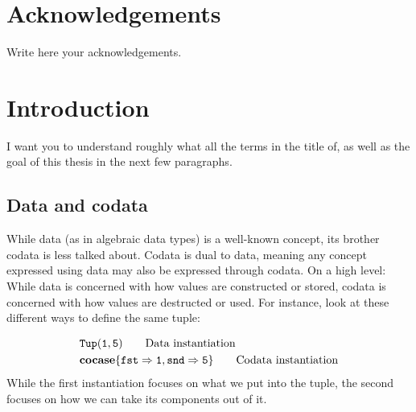\documentclass[twoside,12pt,a4paper]{article}
\begin{document}
\section*{Acknowledgements}

Write here your acknowledgements.

\cleardoublepage


\renewcommand{\baselinestretch}{1.3}
\small\normalsize

\tableofcontents

\renewcommand{\baselinestretch}{1}
\small\normalsize

\cleardoublepage


\setcounter{page}{1}

\section{Introduction}

I want you to understand roughly what all the terms in the title of,
as well as the goal of this thesis in the next few paragraphs. 


\subsection{Data and codata}
While data (as in algebraic data types) is a well-known concept, 
its brother codata is less talked about. Codata is dual to data, meaning any concept expressed using data may also be expressed through codata. 
On a high level: While data is concerned with how values are constructed or stored, codata is concerned with how values are destructed or used. 
For instance, look at these different ways to define the same tuple: 

\begin{example}
    \begin{align*}
        &\mathtt{Tup(}\mathtt{1,5}\mathtt{)} \tag*{Data instantiation}\\
        &\textbf{cocase}\{\mathtt{fst \Rightarrow 1}, \mathtt{snd \Rightarrow 5}\} \tag*{Codata instantiation}
    \end{align*}     
    While the first instantiation focuses on what we put into the tuple, the second focuses on how we can take its components out of it.   
\end{example}
\end{document}
